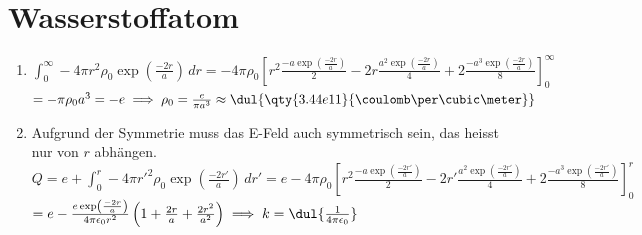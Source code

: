 \documentclass{article}
\begin{document}
\section{Wasserstoffatom}
\begin{enumerate}[label=\alph*)]
    \item $\int_{0}^{\infty} - 4 \pi r^2 \rho_0 \exp \left(\frac{- 2r}{a}\right) \, dr
    = -4 \pi \rho_0 \left[r^2 \frac{-a \exp \left(\frac{-2r}{a} \right)}{2} 
    - 2r \frac{a^2 \exp \left(\frac{-2r}{a} \right)}{4} 
    + 2 \frac{-a^3 \exp \left(\frac{-2r}{a} \right)}{8} \right]_{0}^{\infty}$ \\
    $ = -\pi \rho_0 a^3 = -e \implies \rho_0 = \frac{e}{\pi a^3} \approx \dul{\qty{3.44e11}{\coulomb \per \cubic \meter}}$

    
    \item Aufgrund der Symmetrie muss das E-Feld auch symmetrisch sein, das heisst nur von $r$ abhängen. \\
    $Q = e + \int_{0}^{r} - 4 \pi r'^2 \rho_0 \exp \left(\frac{- 2r'}{a}\right) \, dr' 
    = e - 4 \pi \rho_0 \left[r^2 \frac{-a \exp \left(\frac{-2r'}{a} \right)}{2} 
    - 2r' \frac{a^2 \exp \left(\frac{-2r'}{a} \right)}{4} 
    + 2 \frac{-a^3 \exp \left(\frac{-2r'}{a} \right)}{8} \right]_{0}^{r}$ \\
    $ = e - \frac{e \exp \left(\frac{-2r}{a}\right)}{4 \pi \epsilon_0 r^2} \left(1 + \frac{2r}{a} + \frac{2r^2}{a^2} \right) 
    \implies k = \dul{\frac{1}{4 \pi \epsilon_0}}$

\end{enumerate}
\end{document}
